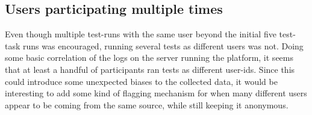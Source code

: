   \subsection{Users participating multiple times}

  Even though multiple test-runs with the same user beyond the initial five
  test-task runs was encouraged, running several tests as different users was
  not. Doing some basic correlation of the logs on the server running the
  platform, it seems that at least a handful of participants ran tests as
  different user-ids. Since this could introduce some unexpected biases to the
  collected data, it would be interesting to add some kind of flagging
  mechanism for when many different users appear to be coming from the same
  source, while still keeping it anonymous.
